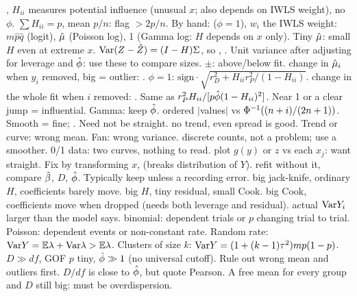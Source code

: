 \sk{} , $H_{ii}$ measures potential influence (unusual $x$; also depends on IWLS weight), no $\phi$. $\sum H_{ii}=p$, mean $p/n$: flag $>2p/n$. By hand:  ($\phi=1$), $w_i$ the IWLS weight: $m\hat p\hat q$ (logit), $\hat{\mu}$ (Poisson log), 1 (Gamma log: $H$ depends on $x$ only). Tiny $\hat{\mu}$: small $H$ even at extreme $x$.
\sk{} $\mathrm{Var}(Z-\hat Z)=(I-H)\Sigma$, so , . Unit variance after adjusting for leverage and $\hat{\phi}$: use these to compare sizes. $\pm$: above/below fit.
\sk{} change in $\hat{\mu}_i$ when $y_i$ removed, big = outlier: . $\phi=1$: $\mathrm{sign}\cdot\sqrt{r_D^2+H_{ii}r_P^2/(1-H_{ii})}$.
\sk{} change in the whole fit when $i$ removed: . Same as $r_P^2H_{ii}/[p\hat{\phi}(1-H_{ii})^2]$. Near 1 or a clear jump = influential. Gamma: keep $\hat{\phi}$.
\sk{} ordered $|$values$|$ vs $\Phi^{-1}((n+i)/(2n+1))$. Smooth = fine; . Need not be straight.
\sk{} no trend, even spread is good. Trend or curve: wrong mean. Fan: wrong variance.  discrete counts, not a problem; use a smoother. 0/1 data: two curves, nothing to read.
\sk{} plot $g(y)$ or $z$ vs each $x_j$: want straight. Fix by transforming $x$,  (breaks distribution of $Y$).
\sk{} refit without it, compare $\hat{\beta}$, $D$, $\hat{\phi}$. Typically keep unless a recording error.
\sk{}  big jack-knife, ordinary $H$, coefficients barely move.  big $H$, tiny residual, small Cook.  big Cook, coefficients move when dropped (needs both leverage and residual).
 actual $\mathrm{Var} Y_i$ larger than the model says.  binomial: dependent trials or $p$ changing trial to trial. Poisson: dependent events or non-constant rate. Random rate: $\mathrm{Var} Y=\mathbb{E}\lambda+\mathrm{Var}\lambda>\mathbb{E}\lambda$. Clusters of size $k$: $\mathrm{Var} Y=(1+(k-1)\tau^2)mp(1-p)$.
\sk{} $D\gg df$, GOF $p$ tiny, $\hat{\phi}\gg1$ (no universal cutoff). Rule out wrong mean and outliers first. $D/df$ is close to $\hat{\phi}$, but quote Pearson. A free mean for every group and $D$ still big: must be overdispersion. 
